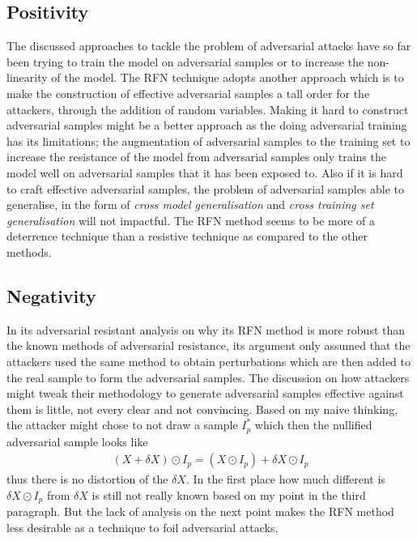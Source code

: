 \documentclass[a4paper,10pt,leqno]{article}
\theoremstyle{definition}
\begin{document}
\subsection*{Positivity}
The discussed approaches to tackle the problem of adversarial attacks have so far been trying to train the model on adversarial samples or to increase the non-linearity of the model. The RFN technique adopts another approach which is to make the construction of effective adversarial samples a tall order for the attackers, through the addition of random variables. Making it hard to construct adversarial samples might be a better approach as the doing adversarial training has its limitations; the augmentation of adversarial samples to the training set to increase the resistance of the model from adversarial samples only trains the model well on adversarial samples that it has been exposed to. Also if it is hard to craft effective adversarial samples, the problem of adversarial samples  \cite{szegedy2013intriguing} able to generalise, in the form of \emph{cross model generalisation} and \emph{cross training set generalisation} will not impactful. The RFN method seems to be more of a deterrence technique than a resistive technique as compared to the other methods.











\subsection*{Negativity}

In its adversarial resistant analysis on why its RFN method is more robust than the known methods of adversarial resistance, its argument only assumed that the attackers used the same method to obtain perturbations which are then added to the real sample to form the adversarial samples. The discussion on how attackers might tweak their methodology to generate adversarial samples effective against them is little, not every clear and not convincing. Based on my naive thinking, the attacker might chose to not draw a sample $I_p^\ast$ which then the nullified adversarial sample looks like
\begin{align}
(X+\delta X ) \odot I_p = (X \odot I_p) + \delta X\odot I_p \label{eq:distort}
\end{align}
thus there is no distortion of the $\delta X$. In the first place how much different is $\delta X \odot I_p$ from $\delta X$ is still not really known based on my point in the third paragraph. But the lack of analysis on the next point makes the RFN method less desirable as a technique to foil adversarial attacks.
\end{document}
